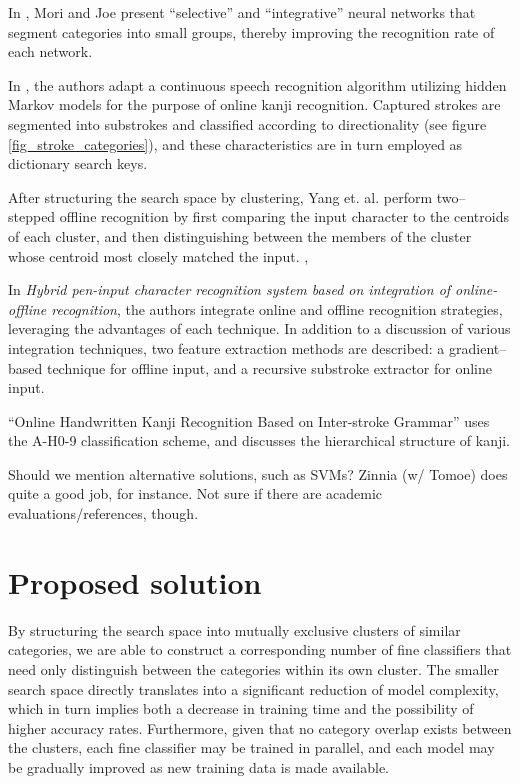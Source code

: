 \documentclass[10pt,conference,a4paper]{IEEEtran}
\begin{document}
	In \cite{joe1989large}, Mori and Joe present ``selective'' and ``integrative'' neural networks that 
	segment categories into small groups, thereby improving the recognition rate of each network.


	In \cite{nakai2001substroke}, the authors adapt a continuous speech recognition algorithm utilizing
	hidden Markov models for the purpose of online kanji recognition. Captured strokes are segmented into
	substrokes and classified according to directionality (see figure \ref{fig_stroke_categories}),
	and these characteristics are in turn employed as dictionary search keys.


	After structuring the search space by clustering, Yang et. al. perform two--stepped offline recognition by first
	comparing the input character to the centroids of each cluster, and then distinguishing between the members of the cluster
	whose centroid most closely matched the input. \cite{yang2003accelerating},


	In \emph{Hybrid pen-input character recognition system based on integration of online-offline recognition},
	the authors integrate online and offline recognition strategies, leveraging the advantages of each technique.
	In addition to a discussion of various integration techniques, two feature extraction methods are described: 
	a gradient--based technique for offline input, and a recursive substroke extractor for online input.



	``Online Handwritten Kanji Recognition Based on Inter-stroke Grammar'' uses the A-H0-9 classification scheme,
	and discusses the hierarchical structure of kanji.


	Should we mention alternative solutions, such as SVMs? Zinnia (w/ Tomoe) does quite a good job, for instance. Not sure if there
	are academic evaluations/references, though.



	\section{Proposed solution}
	\label{sec:proposed_solution}

	By structuring the search space into mutually exclusive clusters of similar categories,
	we are able to construct a corresponding number of fine classifiers that need only distinguish
	between the categories within its own cluster. The smaller search space directly translates into a
	significant reduction of model complexity, which in turn implies both a decrease in training time
	and the possibility of higher accuracy rates. Furthermore, given that no category overlap exists
	between the clusters, each fine classifier may be trained in parallel, and each model may be gradually
	improved as new training data is made available.
\end{document}

